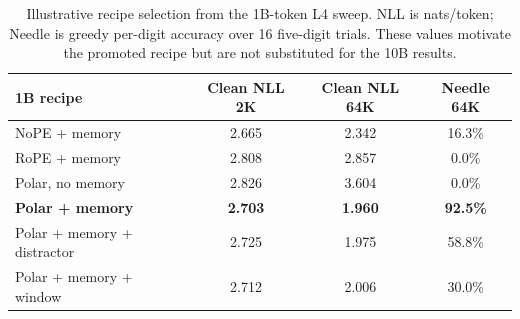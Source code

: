 \documentclass{article} %
\begin{document}
\begin{table}[t]
\centering
\small
\setlength{\tabcolsep}{4pt}
\begin{tabular}{lccc}
\toprule
\textbf{1B recipe} & \textbf{Clean NLL 2K} & \textbf{Clean NLL 64K} & \textbf{Needle 64K} \\
\midrule
NoPE + memory & 2.665 & 2.342 & 16.3\% \\
RoPE + memory & 2.808 & 2.857 & 0.0\% \\
Polar, no memory & 2.826 & 3.604 & 0.0\% \\
\textbf{Polar + memory} & \textbf{2.703} & \textbf{1.960} & \textbf{92.5\%} \\
Polar + memory + distractor & 2.725 & 1.975 & 58.8\% \\
Polar + memory + window & 2.712 & 2.006 & 30.0\% \\
\bottomrule
\end{tabular}
\caption{Illustrative recipe selection from the 1B-token L4 sweep. NLL is nats/token; Needle is greedy per-digit accuracy over 16 five-digit trials. These values motivate the promoted recipe but are not substituted for the 10B results.}
\label{table:ablation_selection}
\end{table}
\end{document}
